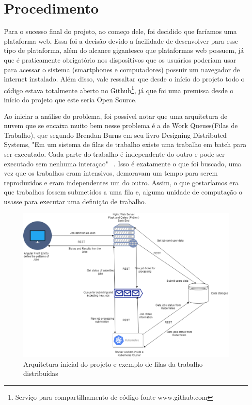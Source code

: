 \documentclass[11pt,twoside]{article}
\begin{document}
\section{Procedimento}
Para o sucesso final do projeto, ao começo dele, foi decidido que faríamos uma plataforma web. Essa foi a decisão devido a facilidade de desenvolver para esse tipo de plataforma, além do alcance
gigantesco que plataformas web possuem, já que é praticamente obrigatório nos dispositivos que os usuários poderiam usar para acessar o sistema (smartphones e computadores) possuir um
navegador de internet instalado. Além disso, vale ressaltar que desde o início do projeto todo o código estava totalmente aberto no Github\footnote{Serviço para compartilhamento de código fonte www.github.com}, já que foi uma premissa desde o início do projeto que este
seria Open Source.

Ao iniciar a análise do problema, foi possível notar que uma arquitetura de nuvem que se encaixa muito bem nesse problema é a de Work Queues(Filas de Trabalho), que segundo Brendan Burns em seu livro
Designing Distributed Systems, "Em um sistema de filas de trabalho existe uma trabalho em batch para ser executado. Cada parte do trabalho é independente do outro e pode ser executado sem nenhuma interaçao" 
~\cite{BB}.
Isso é exatamente o que foi buscado, uma vez que os trabalhos eram intensivos, demoravam um tempo para serem reproduzidos e eram independentes um do outro. Assim, o que gostaríamos era que trabalhos fossem submetidos
a uma fila e, alguma unidade de computação o usasse para executar uma definição de trabalho.

\begin{figure}[!h]
  \centering
  \includegraphics[scale=0.4]{arch.eps}
  \caption{Arquitetura inicial do projeto e exemplo de filas da trabalho distribuídas}
  \label{fig:archtec}
\end{figure}
\end{document}
